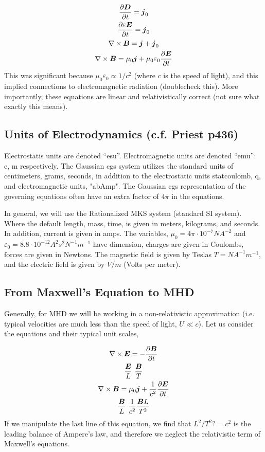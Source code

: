 \documentclass{article}
\begin{document}
\begin{gather*}
    \frac{\partial \boldsymbol{D}}{\partial t} = \boldsymbol{j}_0\\
    \frac{\partial \varepsilon \boldsymbol{E}}{\partial t} = \boldsymbol{j}_0\\
    \nabla\times\boldsymbol{B} = \boldsymbol{j} + \boldsymbol{j}_0\\
    \nabla\times\boldsymbol{B} = \mu_0\boldsymbol{j} + \mu_0\varepsilon_0\frac{\partial \boldsymbol{E}}{\partial t}
\end{gather*}
This was significant because $\mu_0\varepsilon_0 \propto 1/c^2$ (where $c$ is
the speed of light), and this
implied connections to electromagnetic radiation (doublecheck this). More
importantly, these equations are linear and relativistically correct (not sure
what exactly this means). 

\subsection{Units of Electrodynamics (c.f. Priest p436)}

Electrostatis units are denoted ``esu''. Electromagnetic units are denoted
``emu'': e, m respectively. The Gaussian cgs system utilizes the standard units
of centimeters, grams, seconds, in addition to the electrostatic units
statcoulomb, q, and electromagnetic units, "abAmp". The Gaussian cgs
representation of the governing equations often have an extra factor of $4\pi$
in the equations. 

In general, we will use the Rationalized MKS system (standard SI system). Where
the default length, mass, time, is given in meters, kilograms, and seconds. In
addition, current is given in amps. The variables, $\mu_0 = 4\pi\cdot10^{-7}
NA^{-2}$
and $\varepsilon_0 = 8.8\cdot10^{-12} A^2s^2N^{-1}m^{-1}$ have dimension,
charges are given in Coulombs, forces are given in Newtons. The magnetic field
is given by Teslas $T = NA^{-1}m^{-1}$, and the electric field is given by
$V/m$ (Volts per meter). 

\subsection{From Maxwell's Equation to MHD}

Generally, for MHD we will be working in a non-relativistic approximation (i.e.
typical velocities are much less than the speed of light, $U \ll c$). Let us
consider the equations and their typical unit scales,

\begin{gather*}
    \nabla\times\boldsymbol{E} = -\frac{\partial \boldsymbol{B}}{\partial t}\\
    \frac{\boldsymbol{E}}{L} ~ \frac{\boldsymbol{B}}{T}\\
    \nabla\times\boldsymbol{B} = \mu_0\boldsymbol{j} + \frac{1}{c^2} \frac{\partial \boldsymbol{E}}{\partial t}\\
    \frac{\boldsymbol{B}}{L} ~ \frac{1}{c^2}\frac{\boldsymbol{B} L}{T^2}
\end{gather*}
If we manipulate the last line of this equation, we find that $L^2/T^2 ?= c^2$
is the leading balance of Ampere's law, and therefore we neglect the
relativistic term of Maxwell's equations. 
\end{document}
